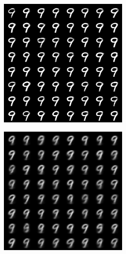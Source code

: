 \documentclass{article}
\begin{document}
\begin{figure}[!h]
\begin{subfigure}[b]{.24\linewidth}
        \caption{}
    \end{subfigure}
    \begin{subfigure}[b]{.24\linewidth}
        \centering
        \includegraphics[width=\linewidth]{mnist_mmvae_condition_on_image_9_image_sample.png}
        \caption{}
    \end{subfigure}
    \begin{subfigure}[b]{.24\linewidth}
        \centering
        \includegraphics[width=\linewidth]{mnist_mmvae_condition_on_text_9_image_sample.png}

\end{subfigure}
\end{figure}
\end{document}
